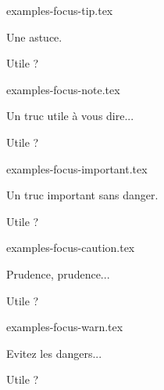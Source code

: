 \begin{filecontents*}{examples-focus-tip.tex}
\begin{bdoctip}
    Une astuce.
\end{bdoctip}

\begin{bdoctip}
    Utile ?
\end{bdoctip}

\end{filecontents*}


\begin{filecontents*}{examples-focus-note.tex}
\begin{bdocnote}
    Un truc utile à vous dire...
\end{bdocnote}

\begin{bdocnote}
    Utile ?
\end{bdocnote}

\end{filecontents*}


\begin{filecontents*}{examples-focus-important.tex}
\begin{bdocimportant}
    Un truc important sans danger.
\end{bdocimportant}

\begin{bdocimportant}
    Utile ?
\end{bdocimportant}

\end{filecontents*}


\begin{filecontents*}{examples-focus-caution.tex}
\begin{bdoccaution}
    Prudence, prudence...
\end{bdoccaution}

\begin{bdoccaution}
    Utile ?
\end{bdoccaution}

\end{filecontents*}


\begin{filecontents*}{examples-focus-warn.tex}
\begin{bdocwarn}
    Evitez les dangers...
\end{bdocwarn}

\begin{bdocwarn}
    Utile ?
\end{bdocwarn}

\end{filecontents*}



